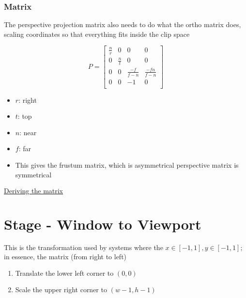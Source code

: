     \subsubsection{Matrix}

      The perspective projection matrix also needs to do what the ortho matrix
      does, scaling coordinates so that everything fits inside the clip space

      \begin{equation}
        P =
        \begin{bmatrix}
          \frac{n}{r} & 0 & 0 & 0 \\
          0 & \frac{n}{t} & 0 & 0 \\
          0 & 0 & \frac{-f}{f - n} & \frac{-fn}{f - n} \\
          0 & 0 & -1 & 0 \\
        \end{bmatrix}
      \end{equation}

      \begin{itemize}
        \item $ r $: right
        \item $ t $: top
        \item $ n $: near
        \item $ f $: far
        \item This gives the frustum matrix, which is asymmetrical
        perspective matrix is symmetrical
      \end{itemize}

      \href{http://www.songho.ca/opengl/gl_projectionmatrix.html}{Deriving
      the matrix}

\section{Stage - Window to Viewport}

  This is the transformation used by systems where the
  $ x \in \left[ -1, 1 \right], y \in \left[ -1, 1 \right] $; in essence,
  the matrix (from right to left)

  \begin{enumerate}
    \item Translate the lower left corner to $ \left( 0, 0 \right) $
    \item Scale the upper right corner to $ \left( w - 1, h - 1 \right) $
  \end{enumerate}

